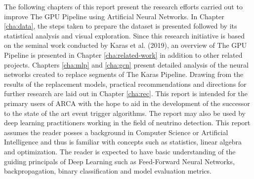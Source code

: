 The following chapters of this report present the research efforts
carried out to improve The GPU Pipeline using Artificial Neural
Networks. In Chapter \ref{cha:data}, the steps taken to prepare the
dataset is presented followed by its statistical analysis and visual
exploration. Since this research initiative is based on the seminal
work conducted by Karas et al. (2019), an overview of The GPU Pipeline
is presented in Chapter \ref{cha:related-work} in addition to other
related projects. Chapters \ref{cha:mlp} and \ref{cha:gcn} present
detailed analysis of the neural networks created to replace segments
of The Karas Pipeline. Drawing from the results of the replacement
models, practical recommendations and directions for further research
are laid out in Chapter \ref{cha:rec}. This report is intended for the
primary users of ARCA with the hope to aid in the development of the
successor to the state of the art event trigger algorithms. The report
may also be used by deep learning practitioners working in the field
of neutrino detection. This report assumes the reader posses a
background in Computer Science or Artificial Intelligence and thus is
familiar with concepts such as statistics, linear algebra and
optimization. The reader is expected to have basic understanding of
the guiding principals of Deep Learning such as Feed-Forward Neural
Networks, backpropagation, binary classification and model evaluation
metrics.
